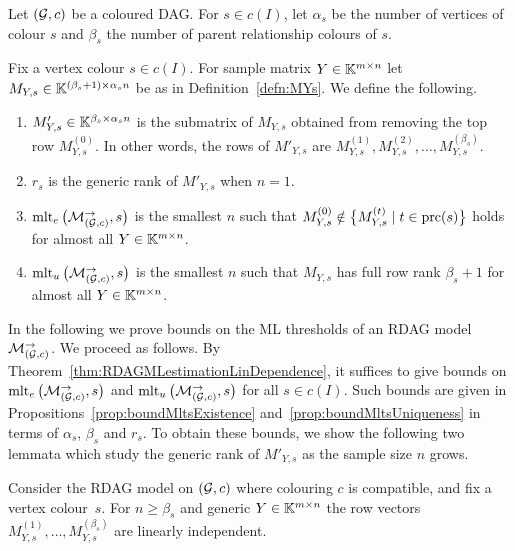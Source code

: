 Let $(\mathcal{G}, c)$ be a coloured DAG. For $s \in c(I)$, let $\alpha_s$ be the number of vertices of colour $s$ and $\beta_s$ the number of parent relationship colours of $s$. 

\begin{defn} \label{defn:M'YsEtc}
	Fix a vertex colour $s \in c(I)$. For sample matrix $Y \in \mathbb K^{m \times n}$ let $M_{Y,s} \in \mathbb K^{(\beta_s + 1) \times \alpha_s n}$ be as in Definition~\ref{defn:MYs}. We define the following.
		\begin{enumerate} \itemsep 0pt
			\item \label{defn:M'Ys}
			$M'_{Y,s} \in \mathbb K^{\beta_s \times \alpha_s n}$ is the submatrix of $M_{Y,s}$ obtained from removing the top row $M_{Y,s}^{(0)}$. In other words, the rows of $M'_{Y,s}$ are $M_{Y,s}^{(1)}, M_{Y,s}^{(2)}, \ldots, M_{Y,s}^{(\beta_s)}$.
			
			\item \label{defn:r-s} $r_s$ is the generic rank of $M'_{Y,s}$ when $n = 1$.
			
			\item $\operatorname{mlt}_e \big(\mathcal{M}_{(\mathcal{G}, c)}^{\to}, s\big)$ is the smallest $n$ such that $M_{Y,s}^{(0)} \notin \big\lbrace M_{Y,s}^{(t)} \mid t \in \operatorname{prc}(s) \big\rbrace$ holds for almost all $Y \in \mathbb K^{m \times n}$.
			
			\item $\operatorname{mlt}_u \big(\mathcal{M}_{(\mathcal{G}, c)}^{\to}, s\big)$ is the smallest $n$ such that $M_{Y,s}$ has full row rank $\beta_s + 1$ for almost all $Y \in \mathbb K^{m \times n}$.\hfill{}
		\end{enumerate}
\end{defn}

In the following we prove bounds on the ML thresholds of an RDAG model $\mathcal{M}_{(\mathcal{G}, c)}^{\to}$. We proceed as follows.
By Theorem~\ref{thm:RDAGMLestimationLinDependence}, it suffices to give bounds on $\operatorname{mlt}_e \big(\mathcal{M}_{(\mathcal{G}, c)}^{\to}, s\big)$ and $\operatorname{mlt}_u \big(\mathcal{M}_{(\mathcal{G}, c)}^{\to}, s\big)$ for all $s \in c(I)$. Such bounds are given in Propositions~\ref{prop:boundMltsExistence} and~\ref{prop:boundMltsUniqueness} in terms of $\alpha_s$, $\beta_s$ and $r_s$.
To obtain these bounds, we show the following two lemmata which study the generic rank of $M'_{Y,s}$ as the sample size $n$ grows.

\begin{lemma} \label{lem:HelpMLTsUniqueness}
	Consider the RDAG model on $(\mathcal{G}, c)$ where colouring $c$ is compatible, and fix a vertex colour~$s$. For $n \geq \beta_s$ and generic $Y \in \mathbb K^{m \times n}$ the row vectors  $M_{Y,s}^{(1)}, \ldots, M_{Y,s}^{(\beta_s)}$ are linearly independent.
\end{lemma}

